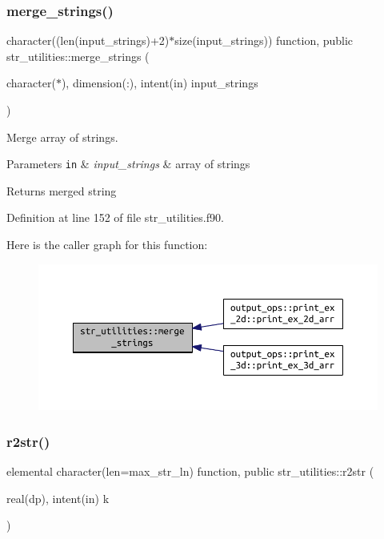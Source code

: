 \subsubsection{\texorpdfstring{merge\+\_\+strings()}{merge\_strings()}}
{\footnotesize\ttfamily character((len(input\+\_\+strings)+2)$\ast$size(input\+\_\+strings)) function, public str\+\_\+utilities\+::merge\+\_\+strings (\begin{DoxyParamCaption}\item[{character($\ast$), dimension(\+:), intent(in)}]{input\+\_\+strings }\end{DoxyParamCaption})}



Merge array of strings. 


\begin{DoxyParams}[1]{Parameters}
\mbox{\tt in}  & {\em input\+\_\+strings} & array of strings\\
\hline
\end{DoxyParams}
\begin{DoxyReturn}{Returns}
merged string 
\end{DoxyReturn}


Definition at line 152 of file str\+\_\+utilities.\+f90.

Here is the caller graph for this function\+:
\nopagebreak
\begin{figure}[H]
\begin{center}
\leavevmode
\includegraphics[width=350pt]{namespacestr__utilities_a6ab16f33c155db79844279c6a56a494c_icgraph}
\end{center}
\end{figure}
\mbox{\label{namespacestr__utilities_a92ac6c0af1979df094de1caddd28ade0}} 
\subsubsection{\texorpdfstring{r2str()}{r2str()}}
{\footnotesize\ttfamily elemental character(len=max\+\_\+str\+\_\+ln) function, public str\+\_\+utilities\+::r2str (\begin{DoxyParamCaption}\item[{real(dp), intent(in)}]{k }\end{DoxyParamCaption})}



